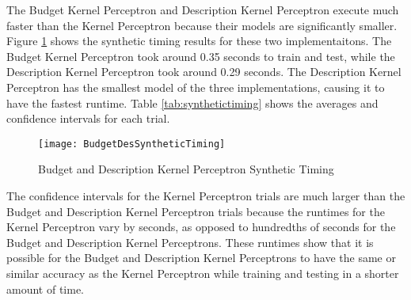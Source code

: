 The Budget Kernel Perceptron and Description Kernel Perceptron execute much faster than the Kernel Perceptron because their models are significantly smaller. Figure \ref{SyntheticBudgetDesTiming} shows the synthetic timing results for these two implementaitons. The Budget Kernel Perceptron took around 0.35 seconds to train and test, while the Description Kernel Perceptron took around 0.29 seconds. The Description Kernel Perceptron has the smallest model of the three implementations, causing it to have the fastest runtime. Table \ref{tab:synthetictiming} shows the averages and confidence intervals for each trial.

\begin{figure}[p]
 \caption{Budget and Description Kernel Perceptron Synthetic Timing}
 \label{SyntheticBudgetDesTiming}
 \texttt{[image: BudgetDesSyntheticTiming]}
\end{figure}

The confidence intervals for the Kernel Perceptron trials are much larger than the Budget and Description Kernel Perceptron trials because the runtimes for the Kernel Perceptron vary by seconds, as opposed to hundredths of seconds for the Budget and Description Kernel Perceptrons. These runtimes show that it is possible for the Budget and Description Kernel Perceptrons to have the same or similar accuracy as the Kernel Perceptron while training and testing in a shorter amount of time. 

